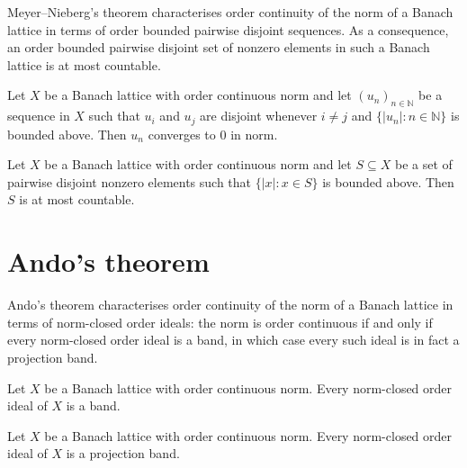 Meyer--Nieberg's theorem characterises order continuity of the
norm of a Banach lattice in terms of order bounded pairwise
disjoint sequences. As a consequence, an order bounded pairwise
disjoint set of nonzero elements in such a Banach lattice is at
most countable.

\begin{theorem}
\label{thm:disjoint-bddAbove-tendsto-zero}
\leanok
{}
Let $X$ be a Banach lattice with order continuous norm and let
$(u_n)_{n \in \mathbb{N}}$ be a sequence in $X$ such that $u_i$
and $u_j$ are disjoint whenever $i \ne j$ and $\{ \lvert u_n
\rvert : n \in \mathbb{N} \}$ is bounded above. Then $u_n$
converges to $0$ in norm.
\end{theorem}

\begin{theorem}
\label{thm:countable-of-pairwise-disjoint-bddAbove}
\leanok
{}
Let $X$ be a Banach lattice with order continuous norm and let $S
\subseteq X$ be a set of pairwise disjoint nonzero elements such
that $\{ \lvert x \rvert : x \in S \}$ is bounded above. Then $S$
is at most countable.
\end{theorem}

\section{Ando's theorem}

Ando's theorem characterises order continuity of the norm of a
Banach lattice in terms of norm-closed order ideals: the norm is
order continuous if and only if every norm-closed order ideal is
a band, in which case every such ideal is in fact a projection
band.

\begin{theorem}
\label{thm:band-of-isClosed-orderIdeal}
\leanok
{}
Let $X$ be a Banach lattice with order continuous norm. Every
norm-closed order ideal of $X$ is a band.
\end{theorem}

\begin{theorem}
\label{thm:projectionBand-of-isClosed-orderIdeal}
\leanok
{}
Let $X$ be a Banach lattice with order continuous norm. Every
norm-closed order ideal of $X$ is a projection band.
\end{theorem}

